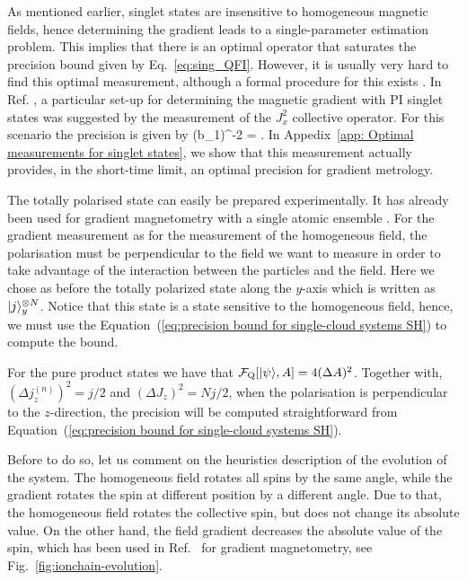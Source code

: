 As mentioned earlier, singlet states are insensitive
to homogeneous magnetic fields,
hence determining the gradient leads to a single-parameter
estimation problem.
This implies that there is an optimal operator that saturates the precision
bound given by Eq.~\eqref{eq:sing_QFI}.
However, it is usually very hard to find
this optimal measurement,
although a formal procedure for this exists \citep{Paris2009}.
In Ref. \citep{Urizar-Lanz2013}, a particular set-up for determining the magnetic gradient
with PI singlet states was suggested by the measurement
of the $J_x^2$ collective operator.
 For this scenario the precision is given by
\be
\label{eq: Jx2_acc}
(\Delta b_1)^{-2}
= .
\ee
In Appedix~\ref{app: Optimal measurements for singlet states},
we  show that this measurement actually provides,
in the short-time limit, an optimal precision for gradient metrology.


The totally polarised state can easily be prepared experimentally.
It has already been used for gradient magnetometry with a single atomic ensemble \citep{Koschorreck2011,Vengalattore2007}.
For the gradient measurement as for the measurement of the homogeneous field, the polarisation must be perpendicular to the field we want to measure in order to take advantage of the interaction between the particles and the field.
Here we chose as before the totally polarized state along the $y$-axis which is written as $\vert j \rangle_y^{\otimes N}$.
Notice that this state is a state sensitive to the homogeneous field, hence, we must use the Equation~(\ref{eq:precision bound for single-cloud systems SH}) to compute the bound.

For the pure product states we have that $\mathcal{F}_{\text{Q}}[\vert \psi \rangle, A] = 4(\Delta A)^2$.
Together with,
$(\Delta j_z^{(n)})^2=j/2$ and $(\Delta J_z)^2=Nj/2$, when the polarisation is
perpendicular to the $z$-direction, the precision will be computed straightforward from Equation~(\ref{eq:precision bound for single-cloud systems SH}).

Before to do so, let us comment on the heuristics description of the evolution of the system.
The homogeneous field rotates all spins by the same angle, while the gradient rotates the spin at different position by a different angle.
Due to that, the homogeneous field rotates the collective spin, but does not change its absolute value.
On the other hand, the field gradient decreases the absolute value of the spin, which has been used in Ref.~\citep{Behbood2013} for gradient magnetometry, see Fig.~\ref{fig:ionchain-evolution}.

